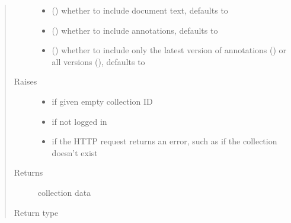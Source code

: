 \documentclass[letterpaper,10pt,english]{sphinxmanual}
\begin{document}
\begin{fulllineitems}
\begin{fulllineitems}
\begin{quote}
\begin{description}
\begin{itemize}
\item {} 
 () \textendash{} whether to include document text, defaults to 

\item {} 
 () \textendash{} whether to include annotations, defaults to 

\item {} 
 () \textendash{} whether to include only the latest version
of annotations () or all versions (), defaults to 

\end{itemize}

\item[{Raises}] \leavevmode\begin{itemize}
\item {} 
{\hyperref[\detokenize{autoapi/pine/client/exceptions/index:pine.client.exceptions.PineClientValueException}]{}} \textendash{} if given empty collection ID

\item {} 
{\hyperref[\detokenize{autoapi/pine/client/exceptions/index:pine.client.exceptions.PineClientAuthException}]{}} \textendash{} if not logged in

\item {} 
{\hyperref[\detokenize{autoapi/pine/client/exceptions/index:pine.client.exceptions.PineClientHttpException}]{}} \textendash{} if the HTTP request returns an error, such as if the
collection doesn’t exist

\end{itemize}

\item[{Returns}] \leavevmode
collection data

\item[{Return type}] \leavevmode
{}

\end{description}\end{quote}

\end{fulllineitems}


\end{fulllineitems}
\end{document}
